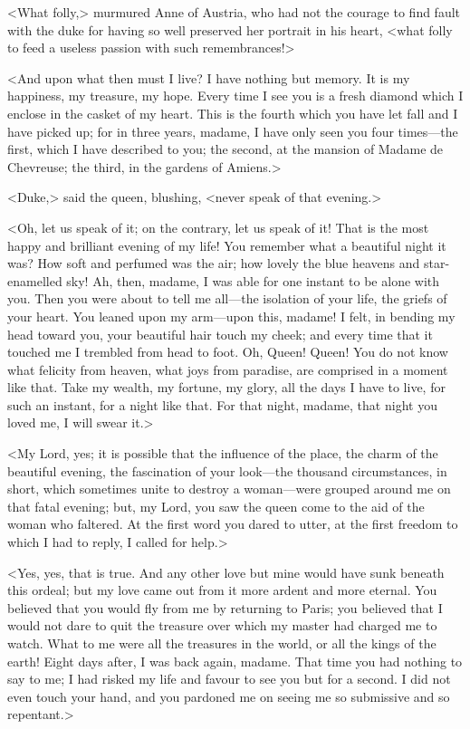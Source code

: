 <What folly,> murmured Anne of Austria, who had not the courage to find fault with the duke for having so well preserved her portrait in his heart, <what folly to feed a useless passion with such remembrances!> 

<And upon what then must I live? I have nothing but memory. It is my happiness, my treasure, my hope. Every time I see you is a fresh diamond which I enclose in the casket of my heart. This is the fourth which you have let fall and I have picked up; for in three years, madame, I have only seen you four times—the first, which I have described to you; the second, at the mansion of Madame de Chevreuse; the third, in the gardens of Amiens.> 

<Duke,> said the queen, blushing, <never speak of that evening.> 

<Oh, let us speak of it; on the contrary, let us speak of it! That is the most happy and brilliant evening of my life! You remember what a beautiful night it was? How soft and perfumed was the air; how lovely the blue heavens and star-enamelled sky! Ah, then, madame, I was able for one instant to be alone with you. Then you were about to tell me all—the isolation of your life, the griefs of your heart. You leaned upon my arm—upon this, madame! I felt, in bending my head toward you, your beautiful hair touch my cheek; and every time that it touched me I trembled from head to foot. Oh, Queen! Queen! You do not know what felicity from heaven, what joys from paradise, are comprised in a moment like that. Take my wealth, my fortune, my glory, all the days I have to live, for such an instant, for a night like that. For that night, madame, that night you loved me, I will swear it.> 

<My Lord, yes; it is possible that the influence of the place, the charm of the beautiful evening, the fascination of your look—the thousand circumstances, in short, which sometimes unite to destroy a woman—were grouped around me on that fatal evening; but, my Lord, you saw the queen come to the aid of the woman who faltered. At the first word you dared to utter, at the first freedom to which I had to reply, I called for help.> 

<Yes, yes, that is true. And any other love but mine would have sunk beneath this ordeal; but my love came out from it more ardent and more eternal. You believed that you would fly from me by returning to Paris; you believed that I would not dare to quit the treasure over which my master had charged me to watch. What to me were all the treasures in the world, or all the kings of the earth! Eight days after, I was back again, madame. That time you had nothing to say to me; I had risked my life and favour to see you but for a second. I did not even touch your hand, and you pardoned me on seeing me so submissive and so repentant.> 

